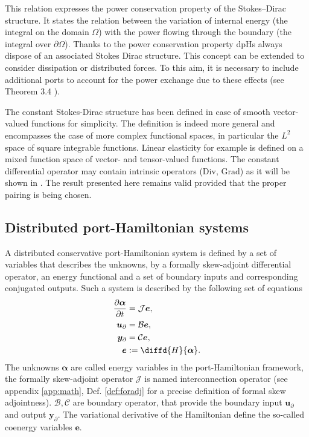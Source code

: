 This  relation expresses the  power  conservation property of the Stokes–Dirac structure. It states the relation between the variation of internal energy (the integral on the domain $\Omega$) with the power flowing through the boundary (the integral over $\partial\Omega$). Thanks to the power conservation property dpHs always dispose of an associated Stokes Dirac structure. This concept can be extended to consider dissipation or distributed forces. To this aim, it is necessary to include additional ports to account for the power exchange due to these effects (see Theorem 3.4 \cite{macchelli2005modelling}). 


\begin{remark}
	The constant Stokes-Dirac structure has been defined in case of smooth vector-valued functions for simplicity.  The definition is indeed more general and encompasses the case of more complex functional spaces, in particular the $L^2$ space of square integrable functions.  Linear elasticity for example is defined on a mixed function space of vector- and tensor-valued functions. The constant differential operator may contain intrinsic operators ($\mathrm{Div}, \, \mathrm{Grad}$) as it will be shown in . The result presented here remains valid provided that the proper {pairing is being chosen}. 
\end{remark}


\subsection{Distributed port-Hamiltonian systems}

A distributed conservative port-Hamiltonian system is defined by a set of variables that describes the unknowns, by a formally skew-adjoint differential operator, an energy functional and a set of boundary inputs and corresponding conjugated outputs. Such a system is described by the following set of equations
\begin{equation}\label{eq:syspH}
\begin{aligned}
\diffp{\bm{\alpha}}{t} &= \mathcal{J}\displaystyle \bm{e}, \vspace{3pt}\\
\bm{u}_\partial &= \mathcal{B}  \displaystyle \bm{e}, \vspace{3pt}\\
\bm{y}_\partial &= \mathcal{C} \displaystyle \bm{e}, \vspace{3pt}\\
\bm{e} &:= \displaystyle \diffd{H}{\bm{\alpha}}.
\end{aligned}
\end{equation}
The unknowns $\bm{\alpha}$ are called energy variables in the port-Hamiltonian framework, the formally skew-adjoint operator $\mathcal{J}$ is named interconnection operator (see appendix \ref{app:math}, Def. \ref{def:foradj} for a precise definition of formal skew adjointness). $\mathcal{B}, \mathcal{C}$ are boundary operator, that provide the boundary input $\bm{u}_\partial$ and output $\bm{y}_\partial$. The variational derivative of the Hamiltonian define the so-called coenergy variables $\bm{e}$.

